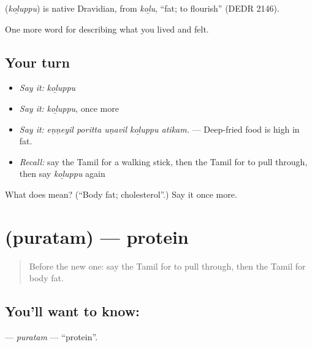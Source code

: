 \begin{cousinweb}
\textbf{} (\emph{koḻuppu}) is native Dravidian, from  \emph{koḻu}, \textquotedblleft{}fat; to flourish\textquotedblright{} (DEDR 2146).
\end{cousinweb}

\begin{grammarlens}[title={What you've built}]
One more word for describing what you lived and felt.
\end{grammarlens}

\subsection*{Your turn}
\begin{itemize}
\raggedright
  \item \emph{Say it:} \emph{koḻuppu}
  \item \emph{Say it:} \emph{koḻuppu}, once more
  \item \emph{Say it:} \emph{eṇṇeyil poritta uṇavil koḻuppu atikam.} — Deep-fried food is high in fat.
  \item \emph{Recall:} say the Tamil for a walking stick, then the Tamil for to pull through, then say \emph{koḻuppu} again
\end{itemize}

\begin{tcolorbox}[breakable,colback=teal!4,colframe=teal!35!black,title={Before you move on}]
What does  mean? (\textquotedblleft{}Body fat; cholesterol\textquotedblright{}.) Say it once more.
\end{tcolorbox}
\section[\texorpdfstring{\ta{புரதம்} (puratam)}{புரதம் (puratam)}]{ (puratam) — protein}

\label{lesson:TA-C487-puratam}



\begin{quote}
Before the new one: say the Tamil for to pull through, then the Tamil for body fat.
\end{quote}

\subsection*{You'll want to know: }
\textbf{} — \emph{puratam} — \textquotedblleft{}protein\textquotedblright{}.

